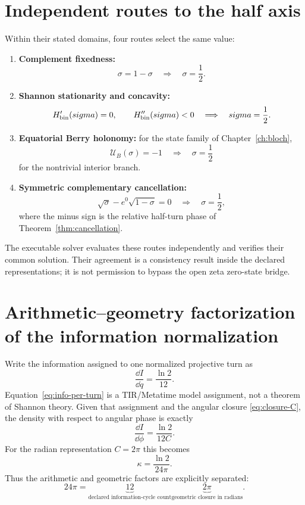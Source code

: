 \section{Independent routes to the half axis}
Within their stated domains, four routes select the same value:
\begin{enumerate}
\item \textbf{Complement fixedness:}
\begin{equation}
\sigma=1-\sigma\quad\Longrightarrow\quad\sigma=\frac12.
\end{equation}
\item \textbf{Shannon stationarity and concavity:}
\begin{equation}
H'_{\rm bin}(\sigma)=0,
\qquad H''_{\rm bin}(\sigma)<0
\quad\Longrightarrow\quad
\sigma=\frac12.
\end{equation}
\item \textbf{Equatorial Berry holonomy:} for the state family of Chapter~\ref{ch:bloch},
\begin{equation}
\mathcal U_B(\sigma)=-1
\quad\Longrightarrow\quad
\sigma=\frac12
\end{equation}
for the nontrivial interior branch.
\item \textbf{Symmetric complementary cancellation:}
\begin{equation}
\sqrt\sigma-e^{0}\sqrt{1-\sigma}=0
\quad\Longrightarrow\quad
\sigma=\frac12,
\end{equation}
where the minus sign is the relative half-turn phase of Theorem~\ref{thm:cancellation}.
\end{enumerate}
The executable solver evaluates these routes independently and verifies their common solution.  Their agreement is a consistency result inside the declared representations; it is not permission to bypass the open zeta zero-state bridge.

\section{Arithmetic--geometry factorization of the information normalization}
Write the information assigned to one normalized projective turn as
\begin{equation}
\frac{\dd I}{\dd q}=\frac{\ln2}{12}.
\label{eq:info-per-turn}
\end{equation}
Equation~\eqref{eq:info-per-turn} is a TIR/Metatime model assignment, not a theorem of Shannon theory.  Given that assignment and the angular closure \eqref{eq:closure-C}, the density with respect to angular phase is exactly
\begin{equation}
\frac{\dd I}{\dd\phi}
=
\frac{\ln2}{12C}.
\label{eq:kappa-C}
\end{equation}
For the radian representation $C=2\pi$ this becomes
\begin{equation}
\boxed{
\kappa=\frac{\ln2}{24\pi}
}.
\label{eq:kappa-cross-derived}
\end{equation}
Thus the arithmetic and geometric factors are explicitly separated:
\begin{equation}
\boxed{
24\pi
=
\underbrace{12}_{\text{declared information-cycle count}}
\underbrace{2\pi}_{\text{geometric closure in radians}}.
}
\end{equation}

